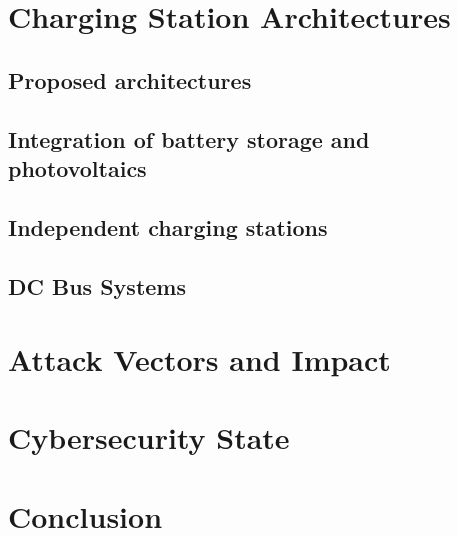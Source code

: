 \documentclass[conference,flushend]{iaria} %
\begin{document}
\section{Charging Station Architectures}

\subsection{Proposed architectures}
\subsection{Integration of battery storage and photovoltaics}
\subsection{Independent charging stations}
\subsection{DC Bus Systems}

\section{Attack Vectors and Impact}



\section{Cybersecurity State}

\section{Conclusion}

\printbibliography
\end{document}
